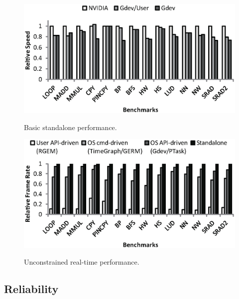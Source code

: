 \begin{figure}[t]
 \begin{center}
  \includegraphics[width=0.9\hsize]{eps/basic_performance.eps}\\
  \vspace{-1.5em}
  \caption{Basic standalone performance.}
  \label{fig:basic_performance}
 \end{center}
 \vspace{-1.5em}
 \begin{center}
  \includegraphics[width=0.9\hsize]{eps/scheduler_overhead.eps}\\
  \vspace{-1.5em}
  \caption{Unconstrained real-time performance.}
  \label{fig:scheduler_overhead}
 \end{center}
 \vspace{-1.5em}
\end{figure}

\vspace{-0.25em}
\subsection{Reliability}
\vspace{-0.25em}

